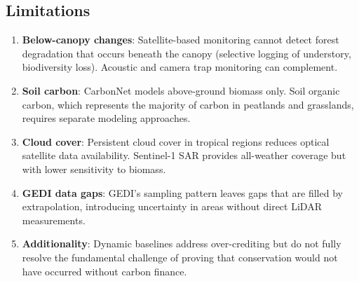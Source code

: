 \subsection{Limitations}

\begin{enumerate}
  \item \textbf{Below-canopy changes}: Satellite-based monitoring
    cannot detect forest degradation that occurs beneath the canopy
    (selective logging of understory, biodiversity loss). Acoustic and
    camera trap monitoring can complement.
  \item \textbf{Soil carbon}: CarbonNet models above-ground biomass
    only. Soil organic carbon, which represents the majority of carbon
    in peatlands and grasslands, requires separate modeling approaches.
  \item \textbf{Cloud cover}: Persistent cloud cover in tropical regions
    reduces optical satellite data availability. Sentinel-1 SAR provides
    all-weather coverage but with lower sensitivity to biomass.
  \item \textbf{GEDI data gaps}: GEDI's sampling pattern leaves gaps
    that are filled by extrapolation, introducing uncertainty in areas
    without direct LiDAR measurements.
  \item \textbf{Additionality}: Dynamic baselines address over-crediting
    but do not fully resolve the fundamental challenge of proving that
    conservation would not have occurred without carbon finance.
\end{enumerate}


